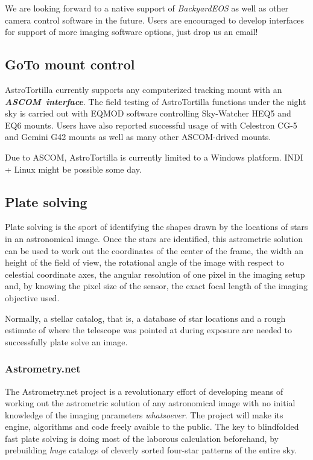\documentclass[english]{article}
\begin{document}
We are looking forward to a native support of \emph{BackyardEOS} as well as other camera control software in the future. Users are encouraged to develop interfaces for support of more imaging software options, just drop us an email!

\subsection{GoTo mount control}

AstroTortilla currently supports any computerized tracking mount with an
\hbox{\textbf{\emph{ASCOM interface}}}.  The field testing of AstroTortilla
functions under the night sky is carried out with EQMOD software controlling
Sky-Watcher HEQ5 and EQ6 mounts. Users have also reported successful usage of with Celestron CG-5 and Gemini G42 mounts as well as many other ASCOM-drived mounts.

Due to ASCOM, AstroTortilla is currently limited to a Windows platform. INDI + Linux might be possible some day.


\subsection{Plate solving}

Plate solving is the sport of identifying the shapes drawn by the locations of
stars in an astronomical image. Once the stars are identified, this astrometric
solution can be used to work out the coordinates of the center of the frame,
the width an height of the field of view, the rotational angle of the image
with respect to celestial coordinate axes, the angular resolution of one pixel
in the imaging setup and, by knowing the pixel size of the sensor, the exact
focal length of the imaging objective used.

Normally, a stellar catalog, that is, a database of star locations and a rough
estimate of where the telescope was pointed at during exposure are needed to
successfully plate solve an image.

\subsubsection{Astrometry.net}

The Astrometry.net project is a revolutionary effort of developing means of
working out the astrometric solution of any astronomical image with no initial
knowledge of the imaging parameters \emph{whatsoever}. The project will make
its engine, algorithms and code freely avaible to the public. The key to
blindfolded fast plate solving is doing most of the laborous calculation beforehand, 
by prebuilding \emph{huge} catalogs of cleverly sorted four-star patterns of the entire sky.
\end{document}
